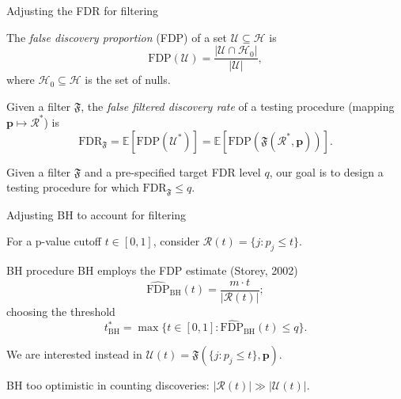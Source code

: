 \documentclass{beamer}
\begin{document}
\begin{frame}{Adjusting the FDR for filtering}

The \textit{false discovery proportion} (FDP) of a set $\mathcal U \subseteq \mathcal H$ is 
\begin{equation*}
\text{FDP}(\mathcal U) = \frac{|\mathcal U \cap \mathcal H_0|}{|\mathcal U|},
\end{equation*}
where $\mathcal H_0 \subseteq \mathcal H$ is the set of nulls.
\vspace{0.1in}

\begin{definition}
Given a filter $\mathfrak F$, the \textit{false filtered discovery rate} of a testing procedure (mapping $\bm p \mapsto \mathcal R^*$) is
\begin{equation*}
\text{FDR}_{\mathfrak F} = \mathbb E[\text{FDP}(\mathcal U^*)] = \mathbb E[\text{FDP}(\mathfrak F(\mathcal R^*, \bm p))].
\end{equation*}
\end{definition}

Given a filter $\mathfrak F$ and a pre-specified target FDR level $q$, our goal is to design a testing procedure for which $\text{FDR}_{\mathfrak F} \leq q$.



\end{frame}


\begin{frame}{Adjusting BH to account for filtering}
	
	
	For a p-value cutoff $t \in [0,1]$, consider $\mathcal R(t) = \{j: p_j \leq t\}$.

	\begin{block}{BH procedure}
	BH employs the FDP estimate (Storey, 2002)
	\begin{equation*}
	\widehat{\text{FDP}}_{\text{BH}}(t) = \frac{m \cdot t}{|\mathcal R(t)|};
	\end{equation*}
	choosing the threshold
	\begin{equation*}
	t^*_{\text{BH}} = \max\{t \in [0,1]: \widehat{\text{FDP}}_{\text{BH}}(t) \leq q\}.
	\end{equation*}
	\end{block}

	We are interested instead in $\mathcal U(t) = \mathfrak F(\{j: p_j \leq t\}, \bm p)$. 
	\vspace{0.1in}
	
	BH too optimistic in counting discoveries: $|\mathcal R(t)| \gg |\mathcal U(t)|$.
	
\end{frame}
\end{document}
